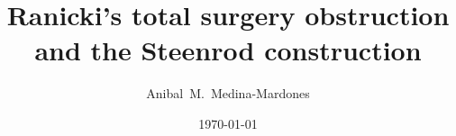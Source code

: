\documentclass{amsart}
\title{Ranicki's total surgery obstruction and the Steenrod construction}
\author[A.~Medina-Mardones]{Anibal~M.~Medina-Mardones}
\date{\today}
\begin{document}
	
	\maketitle
	
	
	
	
	
	
	
	\sloppy
	\printbibliography
\end{document}
